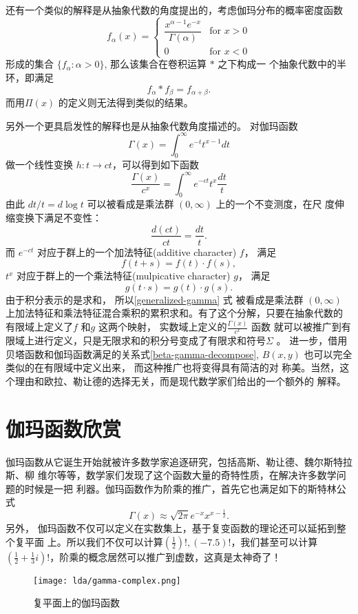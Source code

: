 还有一个类似的解释是从抽象代数的角度提出的，考虑伽玛分布的概率密度函数
$$ f_\alpha(x)=\begin{cases} \dfrac{x^{\alpha-1} e^{-x}}{\Gamma(\alpha)} 
& \text{for }x>0 \\[12pt] 0 & \text{for }x<0 \end{cases} $$
形成的集合 $\{f_\alpha : \alpha > 0\}$, 那么该集合在卷积运算 $*$ 之下构成一
个抽象代数中的半环，即满足
$$ f_\alpha * f_\beta = f_{\alpha+\beta} .$$
而用$\Pi(x)$ 的定义则无法得到类似的结果。 

另外一个更具启发性的解释也是从抽象代数角度描述的。 对伽玛函数
$$ \Gamma(x) = \int_0^{\infty} e^{-t}t^{x-1}dt $$
做一个线性变换 $h: t \rightarrow ct$，可以得到如下函数
\begin{equation}
\label{generalized-gamma}
\frac{\Gamma(x)}{c^x}  = \int_0^{\infty} e^{-ct} t^x \frac{dt}{t} 
\end{equation}
由此 $dt/t = d \log t$ 可以被看成是乘法群 $(0, \infty)$ 上的一个不变测度，在尺
度伸缩变换下满足不变性：
$$ \frac{d(ct)}{ct} = \frac{dt}{t} .$$
而 $e^{-ct}$ 对应于群上的一个加法特征(additive character) $f$， 满足 
$$f(t+s) =f(t) \cdot f(s) ,$$ 
$t^x$ 对应于群上的一个乘法特征(mulpicative character) $g$， 满足
$$g(t \cdot s) = g(t) \cdot g(s) .$$
由于积分表示的是求和， 所以\eqref{generalized-gamma} 式 被看成是乘法群 $(0,
\infty)$ 上加法特征和乘法特征混合乘积的累积求和。有了这个分解，只要在抽象代数的
有限域上定义了$f$ 和$g$ 这两个映射， 实数域上定义的$\frac{\Gamma(x)}{c^x}$ 函数
就可以被推广到有限域上进行定义，只是无限求和的积分号变成了有限求和符号$\Sigma$
。 进一步，借用贝塔函数和伽玛函数满足的关系式\eqref{beta-gamma-decompose},
$B(x,y)$ 也可以完全类似的在有限域中定义出来， 而这种推广也将变得具有简洁的对
称美。当然，这个理由和欧拉、勒让德的选择无关，而是现代数学家们给出的一个额外的
解释。

\section{伽玛函数欣赏}

伽玛函数从它诞生开始就被许多数学家追逐研究，包括高斯、勒让德、魏尔斯特拉斯、柳
维尔等等，数学家们发现了这个函数大量的奇特性质，在解决许多数学问题的时候是一把
利器。伽玛函数作为阶乘的推广，首先它也满足如下的斯特林公式
$$ \Gamma(x) \approx \sqrt{2\pi}e^{-x}x^{x-\frac{1}{2}} .$$
另外， 伽玛函数不仅可以定义在实数集上，基于复变函数的理论还可以延拓到整个复平面
上。所以我们不仅可以计算$ (\frac{1}{2})!, (-7.5)!$，我们甚至可以计算
$(\frac{1}{2} + \frac{1}{3}i)!$，阶乘的概念居然可以推广到虚数，这真是太神奇了！ 
\begin{figure}[H]
\centering
\texttt{[image: lda/gamma-complex.png]}
\caption{复平面上的伽玛函数}
\end{figure}

